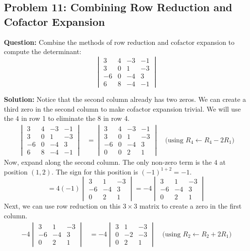 \documentclass{article}
\begin{document}
\subsection{Problem 11: Combining Row Reduction and Cofactor Expansion}
\textbf{Question:} Combine the methods of row reduction and cofactor expansion to compute the determinant:
\[ \begin{vmatrix} 3 & 4 & -3 & -1 \\ 3 & 0 & 1 & -3 \\ -6 & 0 & -4 & 3 \\ 6 & 8 & -4 & -1 \end{vmatrix} \]

\textbf{Solution:}
Notice that the second column already has two zeros. We can create a third zero in the second column to make cofactor expansion trivial. We will use the $4$ in row 1 to eliminate the $8$ in row 4.
\begin{align*}
    \begin{vmatrix} 3 & 4 & -3 & -1 \\ 3 & 0 & 1 & -3 \\ -6 & 0 & -4 & 3 \\ 6 & 8 & -4 & -1 \end{vmatrix} 
    &= \begin{vmatrix} 3 & 4 & -3 & -1 \\ 3 & 0 & 1 & -3 \\ -6 & 0 & -4 & 3 \\ 0 & 0 & 2 & 1 \end{vmatrix} \quad \text{(using } R_4 \leftarrow R_4 - 2R_1 \text{)}
\end{align*}
Now, expand along the second column. The only non-zero term is the $4$ at position $(1,2)$. The sign for this position is $(-1)^{1+2} = -1$.
\[ = 4(-1) \begin{vmatrix} 3 & 1 & -3 \\ -6 & -4 & 3 \\ 0 & 2 & 1 \end{vmatrix} = -4 \begin{vmatrix} 3 & 1 & -3 \\ -6 & -4 & 3 \\ 0 & 2 & 1 \end{vmatrix} \]
Next, we can use row reduction on this $3 \times 3$ matrix to create a zero in the first column.
\begin{align*}
    -4 \begin{vmatrix} 3 & 1 & -3 \\ -6 & -4 & 3 \\ 0 & 2 & 1 \end{vmatrix} 
    &= -4 \begin{vmatrix} 3 & 1 & -3 \\ 0 & -2 & -3 \\ 0 & 2 & 1 \end{vmatrix} \quad \text{(using } R_2 \leftarrow R_2 + 2R_1 \text{)}
\end{align*}
\end{document}
